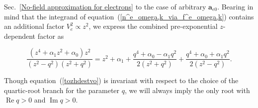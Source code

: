 \documentclass[draft]{agujournal2019}
\renewcommand{\vec}{\mathbf}
\begin{document}
Sec.~\ref{No-field approximation for electrons} to the case of arbitrary $\vec{a}_{e0}$.
Bearing in mind that the integrand of equation~(\ref{n^e_omega,k_via_f^e_omega,k}) contains an additional factor
$V_{e}^2 \propto z^2$, we express the combined pre-exponential $z$-dependent factor as
\begin{linenomath*}
\begin{equation}
\frac{(z^{4}+\alpha_{1}z^{2}+\alpha_{0})z^{2}}{(z^{2}-q^{2})(z^{2}+q^{2})}
=z^{2}+\alpha_{1}+\frac{q^{4}+\alpha_{0}-\alpha_{1}q^{2}}{2(z^{2}
+q^{2})}+\frac{q^{4}+\alpha_{0}+\alpha_{1}q^{2}}{2(z^{2}-q^{2})}.
\label{tozhdestvo}
\end{equation}
\end{linenomath*}
Though equation~(\ref{tozhdestvo}) is invariant with respect to the choice of the quartic-root 
branch for the parameter $q$, we will always imply the only root with $\operatorname{Re}q > 0$ and $\operatorname{Im}q > 0$.
\end{document}
